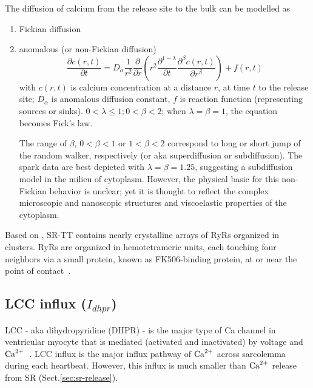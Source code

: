 The diffusion of calcium from the release site to the bulk can be modelled
as
\begin{enumerate}
  \item Fickian diffusion
  \item anomalous (or non-Fickian diffusion) 
  \begin{equation}
  \frac{\partial c(r,t)}{\partial t} = D_\alpha
  \frac{1}{r^2}\frac{\partial}{\partial r} \left( r^2
  \frac{\partial^{1-\lambda}}{\partial t} \frac{\partial^\beta c(r,t)}{\partial
  r^\beta} \right) + f(r,t)
  \end{equation}
  with $c(r,t)$ is calcium concentration at a distance $r$, at time $t$ to the
  release site; $D_\alpha$ is anomalous diffusion constant, $f$ is reaction
  function (representing sources or sinks). $0 < \lambda \le 1; 0 < \beta < 2$;
  when $\lambda=\beta=1$, the equation becomes Fick's law. 
  
  The range of $\beta$, $0 < \beta < 1$ or $1<\beta<2$ correspond
  to long or short jump of the random walker, respectively (or aka
  superdiffusion or subdiffusion). The spark data are
  best depicted with $\lambda=\beta = 1.25$, suggesting a subdiffusion model in
  the milieu of cytoplasm. However, the physical basic for this non-Fickian
  behavior is unclear; yet it is thought to reflect the complex microscopic and
  nanoscopic structures and viscoelastic properties of the cytoplasm. 
  
  
\end{enumerate}
 
Based on \citep{franzini_armstrong1998, franzini_armstrong1999ssd},
SR-TT contains nearly crystalline arrays of RyRs organized in
clusters. RyRs are organized in hemotetrameric units, each touching
four neighbors via a small protein, known as FK506-binding protein, at
or near the point of contact~\citep{Sharma1998, wagenknecht1997}.


\subsection[LCC influx]{LCC influx ($I_{dhpr}$)}
\label{sec:lcc-influx}

LCC - aka dihydropyridine (DHPR) - is the major type of Ca channel in
ventricular myocyte that is mediated (activated and inactivated) by voltage and
${\text{Ca}^{2+}}$~\citep{lee1985icc, shirokov1993cdi}. LCC influx is the major influx
pathway of ${\text{Ca}^{2+}}$ across sarcolemma during each heartbeat. However, this influx
is much smaller than ${\text{Ca}^{2+}}$ release from SR (Sect.\ref{sec:sr-release}).  

